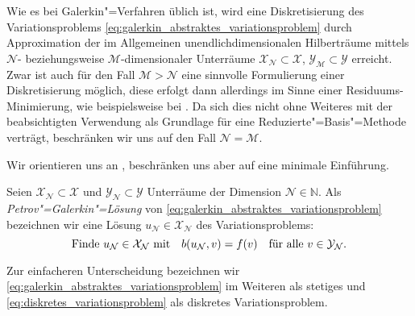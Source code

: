 \documentclass[../main.tex]{subfiles}
\begin{document}
Wie es bei Galerkin"=Verfahren üblich ist, wird eine Diskretisierung des Variationsproblems \cref{eq:galerkin_abstraktes_variationsproblem} durch Approximation der im Allgemeinen unendlichdimensionalen Hilberträume mittels $\mathcal N$- beziehungsweise $\mathcal M$-dimensionaler Unterräume $\mathcal X_{\mathcal N} \subset \mathcal X$, $\mathcal Y_{\mathcal M} \subset \mathcal Y$ erreicht.
Zwar ist auch für den Fall $\mathcal M > \mathcal N$ eine sinnvolle Formulierung einer Diskretisierung möglich, diese erfolgt dann allerdings im Sinne einer Residuums-Minimierung, wie beispielsweise bei \cite{Andreev:2012ep}.
Da sich dies nicht ohne Weiteres mit der beabsichtigten Verwendung als Grundlage für eine Reduzierte"=Basis"=Methode verträgt, beschränken wir uns auf den Fall $\mathcal N = \mathcal M$.

Wir orientieren uns an \cite[Section 3.1]{Nochetto:2009il}, beschränken uns aber auf eine minimale Einführung.

\begin{Definition}\label{definition:disrekte_loesung}
    Seien $\mathcal X_{\mathcal N} \subset \mathcal X$ und $\mathcal Y_{\mathcal N} \subset \mathcal Y$ Unterräume der Dimension $\mathcal N \in \mathbb{N}$.
    Als \emph{Petrov"=Galerkin"=Lösung} von \cref{eq:galerkin_abstraktes_variationsproblem} bezeichnen wir eine Lösung $u_{\mathcal N} \in \mathcal X_{\mathcal N}$ des Variationsproblems:
    \begin{equation}\label{eq:diskretes_variationsproblem}
        \text{Finde}~u_{\mathcal N} \in \mathcal X_{\mathcal N} \text{ mit} \quad  b(u_{\mathcal N}, v) = f(v) \quad \fa v \in \mathcal Y_{\mathcal N}.
    \end{equation}
\end{Definition}

Zur einfacheren Unterscheidung bezeichnen wir \cref{eq:galerkin_abstraktes_variationsproblem} im Weiteren als stetiges und \cref{eq:diskretes_variationsproblem} als diskretes Variationsproblem.
\end{document}

